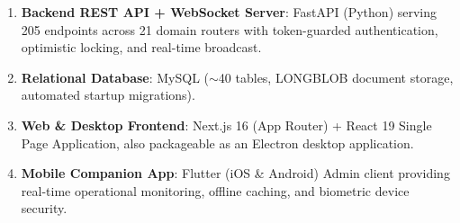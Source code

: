 \documentclass[11pt,a4paper]{article}
\begin{document}
\begin{enumerate}[leftmargin=1.4em,itemsep=3pt]
  \item \textbf{Backend REST API + WebSocket Server}: FastAPI (Python) serving 205 endpoints across 21 domain routers with token-guarded authentication, optimistic locking, and real-time broadcast.
  \item \textbf{Relational Database}: MySQL ($\sim$40 tables, LONGBLOB document storage, automated startup migrations).
  \item \textbf{Web \& Desktop Frontend}: Next.js 16 (App Router) + React 19 Single Page Application, also packageable as an Electron desktop application.
  \item \textbf{Mobile Companion App}: Flutter (iOS \& Android) Admin client providing real-time operational monitoring, offline caching, and biometric device security.
\end{enumerate}
\end{document}
